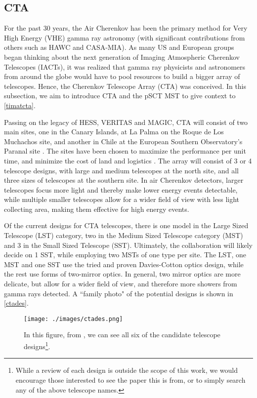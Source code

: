 \subsection{CTA}
\label{cta}
For the past 30 years, the Air Cherenkov has been the primary method for Very High Energy (VHE) gamma ray astronomy (with significant contributions from others such as HAWC and CASA-MIA). As many US and European groups began thinking about the next generation of Imaging Atmospheric Cherenkov Telescopes (IACTs),  it was realized that gamma ray physicists and astronomers from around the globe would have to pool resources to build a bigger array of telescopes. Hence, the Cherenkov Telescope Array (CTA) was conceived. In this subsection, we aim to introduce CTA and the pSCT MST to give context to \autoref{timatcta}.

Passing on the legacy of HESS, VERITAS and MAGIC, CTA will consist of two main sites, one in the Canary Islands, at La Palma on the Roque de Los Muchachos site, and another in Chile at the European Southern Observatory's Paranal site \cite{ctaong}. The sites have been chosen to maximize the performance per unit time, and minimize the cost of land and logistics \cite{tarek}. The array will consist of 3 or 4 telescope designs, with large and medium telescopes at the north site, and all three sizes of telescopes at the southern site. In air Cherenkov detectors, larger telescopes focus more light and thereby make lower energy events detectable, while multiple smaller telescopes allow for a wider field of view with less light collecting area, making them effective for high energy events.

Of the current designs for CTA telescopes, there is one model in the Large Sized Telescope (LST) category, two in the Medium Sized Telescope category (MST) and 3 in the Small Sized Telescope (SST). Ultimately, the collaboration will likely decide on 1 SST, while employing two MSTs of one type per site. The LST, one MST and one SST use the tried and proven Davies-Cotton optics design, while the rest use forms of two-mirror optics. In general, two mirror optics are more delicate, but allow for a wider field of view, and therefore more showers from gamma rays detected. A ``family photo" of the potential designs is shown in \autoref{ctades}.

\begin{figure}[h!]
\begin{center}
\texttt{[image: ./images/ctades.png]}
\caption[CTA Telescope Candidates]{In this figure, from \textcite{ctaong}, we can see all six of the candidate telescope designs\footnote{While a review of each design is outside the scope of this work, we would encourage those interested to see the paper this is from, or to simply search any of the above telescope names.}. }
\label{ctades}
\end{center}
\end{figure}

